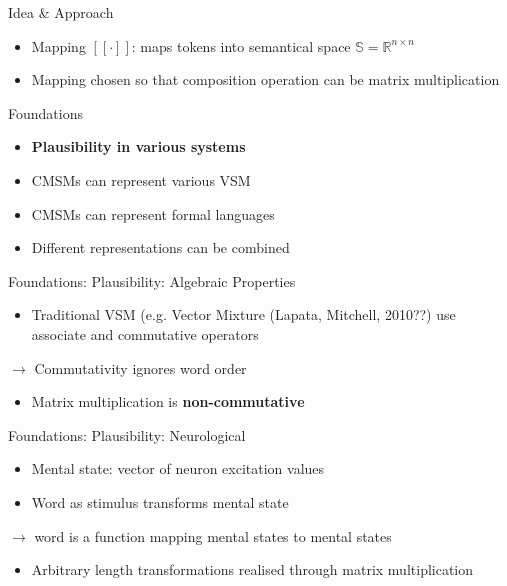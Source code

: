 \documentclass[12pt,a4paper]{beamer}
\begin{document}
\begin{frame}{Idea \& Approach}
\begin{itemize}
\item Mapping $[[\cdot]]$: maps tokens into semantical space $ \mathbb{S}=\mathbb{R}^{n \times n} $
\item Mapping chosen so that composition operation can be matrix multiplication 

\end{itemize}
\end{frame}


\begin{frame}{Foundations}
\begin{itemize}
\item \textbf{Plausibility in various systems}
\item CMSMs can represent various VSM
\item CMSMs can represent formal languages
\item Different representations can be combined
\end{itemize}
\end{frame}

\begin{frame}{Foundations: Plausibility: Algebraic Properties}
\begin{itemize}
\item Traditional VSM (e.g. Vector Mixture (Lapata, Mitchell, 2010??) 
 use associate and commutative operators
\end{itemize}
$\to$ Commutativity ignores word order
\begin{itemize}
\item Matrix multiplication is \textbf{non-commutative}
\end{itemize}
\end{frame}

\begin{frame}{Foundations: Plausibility: Neurological}
\begin{itemize}
\item Mental state: vector of neuron excitation values
\item Word as stimulus transforms mental state
\end{itemize}
$\to$ word is a function mapping mental states to mental states
\begin{itemize}
\item Arbitrary length transformations realised through matrix multiplication
\end{itemize}
\end{frame}
\end{document}
